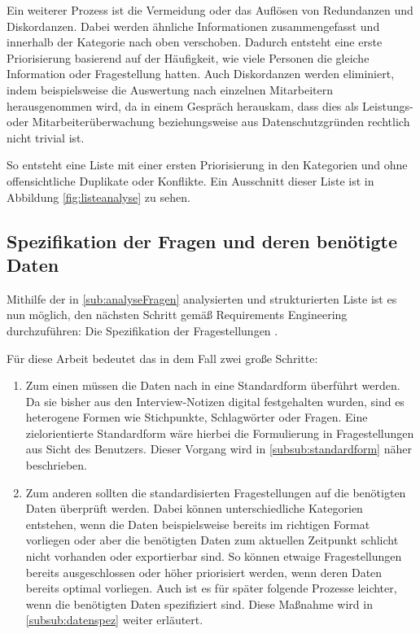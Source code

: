 Ein weiterer Prozess ist die Vermeidung oder das Auflösen von Redundanzen und Diskordanzen.
Dabei werden ähnliche Informationen zusammengefasst und innerhalb der Kategorie nach oben verschoben.
Dadurch entsteht eine erste Priorisierung basierend auf der Häufigkeit, wie viele Personen die gleiche Information oder Fragestellung hatten.
Auch Diskordanzen werden eliminiert, indem beispielsweise die Auswertung nach einzelnen Mitarbeitern herausgenommen wird, da in einem Gespräch herauskam, dass dies als Leistungs- oder Mitarbeiterüberwachung beziehungsweise aus Datenschutzgründen rechtlich nicht trivial ist.

So entsteht eine Liste mit einer ersten Priorisierung in den Kategorien und ohne offensichtliche Duplikate oder Konflikte.
Ein Ausschnitt dieser Liste ist in Abbildung \ref{fig:listeanalyse} zu sehen.
\clearpage
\subsection{Spezifikation der Fragen und deren benötigte Daten}
\label{sub:spezifikation}
Mithilfe der in \ref{sub:analyseFragen} analysierten und strukturierten Liste ist es nun möglich, den nächsten Schritt gemäß Requirements Engineering durchzuführen: Die Spezifikation der Fragestellungen \cite{Pohl.2011}.

Für diese Arbeit bedeutet das in dem Fall zwei große Schritte: 
\begin{enumerate}
\item Zum einen müssen die Daten nach \cite{Patig.} in eine Standardform überführt werden. 
Da sie bisher aus den Interview-Notizen digital festgehalten wurden, sind es heterogene Formen wie Stichpunkte, Schlagwörter oder Fragen.
Eine zielorientierte Standardform wäre hierbei die Formulierung in Fragestellungen aus Sicht des Benutzers.
Dieser Vorgang wird in \ref{subsub:standardform} näher beschrieben.
\item Zum anderen sollten die standardisierten Fragestellungen auf die benötigten Daten überprüft werden.
Dabei können unterschiedliche Kategorien entstehen, wenn die Daten beispielsweise bereits im richtigen Format vorliegen oder aber die benötigten Daten zum aktuellen Zeitpunkt schlicht nicht vorhanden oder exportierbar sind.
So können etwaige Fragestellungen bereits ausgeschlossen oder höher priorisiert werden, wenn deren Daten bereits optimal vorliegen.
Auch ist es für später folgende Prozesse leichter, wenn die benötigten Daten spezifiziert sind.
Diese Maßnahme wird in \ref{subsub:datenspez} weiter erläutert.
\end{enumerate}

